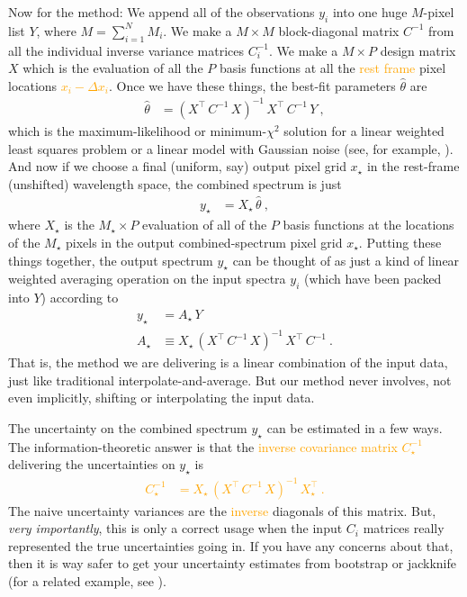 \documentclass[modern, linenumbers]{aastex631}
\newcommand{\modified}[1]{\textcolor{orange}{#1}}
\begin{document}
Now for the method:
We append all of the observations $y_i$ into one huge $M$-pixel list $Y$, where $M=\sum_{i=1}^N M_i$.
We make a $M\times M$ block-diagonal matrix $C^{-1}$ from all the individual inverse variance matrices $C_i^{-1}$.
We make a $M\times P$ design matrix $X$ which is the evaluation of all the $P$ basis functions at all the \modified{rest frame} pixel locations \modified{$x_i - \Delta{}x_i$}.
Once we have these things, the best-fit parameters $\hat\theta$ are
\begin{align}
    \hat\theta &= (X^\top\,C^{-1}\,X)^{-1}\,X^\top\,C^{-1}\,Y ~, \label{eq:xtxinvxty}
\end{align}
which is the maximum-likelihood or minimum-$\chi^2$ solution for a linear weighted least squares problem or a linear model with Gaussian noise (see, for example, \citealt{fitting}).
And now if we choose a final (uniform, say) output pixel grid $x_\star$ in the rest-frame (unshifted) wavelength space, the combined spectrum is just
\begin{align}
    y_\star &= X_\star\,\hat\theta ~,
\end{align}
where $X_\star$ is the $M_\star\times P$ evaluation of all of the $P$ basis functions at the locations of the $M_\star$ pixels in the output combined-spectrum pixel grid $x_\star$.
Putting these things together, the output spectrum $y_\star$ can be thought of as just a kind of linear weighted averaging operation on the input spectra $y_i$ (which have been packed into $Y$) according to
\begin{align}
    y_\star &= A_\star\,Y \\
    A_\star &\equiv X_\star\,(X^\top\,C^{-1}\,X)^{-1}\,X^\top\,C^{-1} ~.
\end{align}
That is, the method we are delivering is a linear combination of the input data, just like traditional interpolate-and-average.
But our method never involves, not even implicitly, shifting or interpolating the input data.

The uncertainty on the combined spectrum $y_\star$ can be estimated in a few ways.
The information-theoretic answer is that the \modified{inverse covariance matrix $C_\star^{-1}$} delivering the uncertainties on $y_\star$ is
\modified{
\begin{align}
    C_\star^{-1} &= X_\star\,(X^\top\,C^{-1}\,X)^{-1}\,X_\star^\top ~.\label{eq:outcovar}
\end{align}
}
The naive uncertainty variances are the \modified{inverse} diagonals of this matrix.
But, \emph{very importantly}, this is only a correct usage when the input $C_i$ matrices really represented the true uncertainties going in.
If you have any concerns about that, then it is way safer to get your uncertainty estimates from bootstrap or jackknife (for a related example, see \citealt{fittingflexible}).
\end{document}
